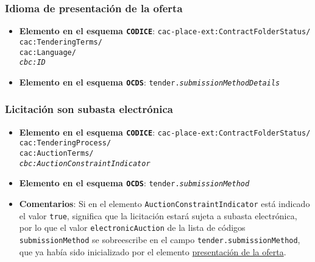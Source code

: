         \subsubsection{Idioma de presentación de la oferta}
            \begin{itemize}
                \item \textbf{Elemento en el esquema \texttt{CODICE}}:
                    \tabto{7.6cm} \texttt{cac-place-ext:ContractFolderStatus/} \\
                    \tabto{7.6cm} \texttt{cac:TenderingTerms/} \\
                    \tabto{7.6cm} \texttt{cac:Language/} \\
                    \tabto{7.6cm} \texttt{\textit{cbc:ID}}
                \item \textbf{Elemento en el esquema \texttt{OCDS}}:
                    \tabto{7.6cm} \texttt{tender.\textit{submissionMethodDetails}}
            \end{itemize}
        
        \subsubsection{Licitación son subasta electrónica}
            \begin{itemize}
                \item \textbf{Elemento en el esquema \texttt{CODICE}}:
                    \tabto{7.6cm} \texttt{cac-place-ext:ContractFolderStatus/} \\
                    \tabto{7.6cm} \texttt{cac:TenderingProcess/} \\
                    \tabto{7.6cm} \texttt{cac:AuctionTerms/} \\
                    \tabto{7.6cm} \texttt{\textit{cbc:AuctionConstraintIndicator}}
                \item \textbf{Elemento en el esquema \texttt{OCDS}}:
                    \tabto{7.6cm} \texttt{tender.\textit{submissionMethod}}
                \item \textbf{Comentarios}: Si en el elemento \texttt{AuctionConstraintIndicator} está indicado el valor \texttt{true}, significa que la licitación estará sujeta a subasta electrónica, por lo que el valor \texttt{electronicAuction} de la lista de códigos \texttt{submissionMethod} \cite{CR11} se sobreescribe en el campo \texttt{tender.submissionMethod}, que ya había sido inicializado por el elemento \hyperref[subsec:PresentacionOferta]{presentación de la oferta}.
            \end{itemize}
        

